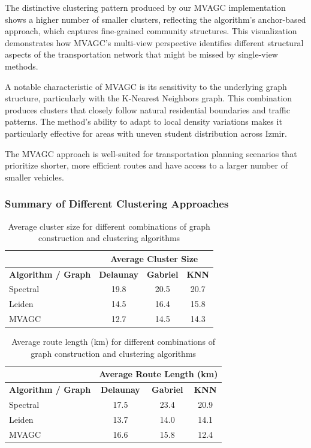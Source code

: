 The distinctive clustering pattern produced by our MVAGC implementation shows a higher number of smaller clusters, reflecting the algorithm's anchor-based approach, which captures fine-grained community structures. This visualization demonstrates how MVAGC's multi-view perspective identifies different structural aspects of the transportation network that might be missed by single-view methods.

A notable characteristic of MVAGC is its sensitivity to the underlying graph structure, particularly with the K-Nearest Neighbors graph. This combination produces clusters that closely follow natural residential boundaries and traffic patterns. The method's ability to adapt to local density variations makes it particularly effective for areas with uneven student distribution across Izmir.

The MVAGC approach is well-suited for transportation planning scenarios that prioritize shorter, more efficient routes and have access to a larger number of smaller vehicles.

\subsubsection{Summary of Different Clustering Approaches}
\label{subsubsec:clustering_comparison}

\begin{table}[!hb]
\centering
\begin{tabular}{|l|c|c|c|}
\hline
& \multicolumn{3}{c|}{\textbf{Average Cluster Size}} \\
\hline
\textbf{Algorithm / Graph} & \textbf{Delaunay} & \textbf{Gabriel} & \textbf{KNN} \\
\hline
Spectral & 19.8 & 20.5 & 20.7 \\
\hline
Leiden & 14.5 & 16.4 & 15.8 \\
\hline
MVAGC & 12.7 & 14.5 & 14.3 \\
\hline
\end{tabular}
\caption{Average cluster size for different combinations of graph construction and clustering algorithms}
\label{tab:avg_cluster_size}
\end{table}

\begin{table}[!hb]
\centering
\begin{tabular}{|l|c|c|c|}
\hline
& \multicolumn{3}{c|}{\textbf{Average Route Length (km)}} \\
\hline
\textbf{Algorithm / Graph} & \textbf{Delaunay} & \textbf{Gabriel} & \textbf{KNN} \\
\hline
Spectral & 17.5 & 23.4 & 20.9 \\
\hline
Leiden & 13.7 & 14.0 & 14.1 \\
\hline
MVAGC & 16.6 & 15.8 & 12.4 \\
\hline
\end{tabular}
\caption{Average route length (km) for different combinations of graph construction and clustering algorithms}
\label{tab:avg_route_length}
\end{table}

